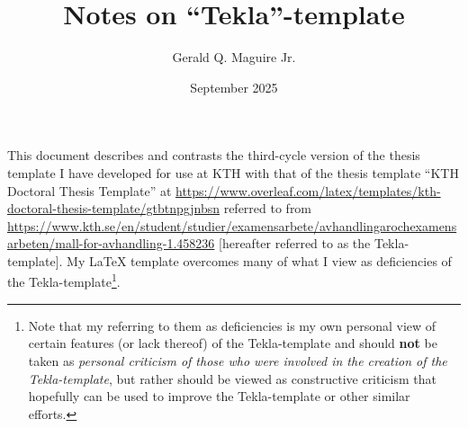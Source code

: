 \documentclass[12pt, twoside]{article}
\title{Notes on ``Tekla''-template}
\author{Gerald Q. Maguire Jr.}
\date{September 2025}
\renewcommand{\sectionmark}[1]{%
\markboth{#1}{}}
\begin{document}
\glsresetall[]
\maketitle
{}

This document describes and contrasts the third-cycle version of the thesis
template I have developed for use at \gls{KTH} with that of the thesis
template ``KTH Doctoral Thesis Template'' at 
\url{https://www.overleaf.com/latex/templates/kth-doctoral-thesis-template/gtbtnpgjnbsn} referred to from \url{https://www.kth.se/en/student/studier/examensarbete/avhandlingarochexamensarbeten/mall-for-avhandling-1.458236}
[hereafter referred to as the Tekla-template].
My \LaTeX{} template overcomes many of what I view as deficiencies of the Tekla-template\footnote{Note that my referring to them as deficiencies is my own personal view of certain features (or lack thereof) of the Tekla-template and should \textbf{not} be taken as \textit{personal criticism of those who were involved in the creation of the Tekla-template}, but rather should be viewed as constructive criticism that hopefully can be used to improve the Tekla-template or other similar efforts.}.
\cleardoublepage
\renewcommand{\sectionmark}[1]{ \markboth{#1}{}}
\tableofcontents
\markboth{\contentsname}{}
\cleardoublepage
\setcounter{page}{1}
\glsresetall
\end{document}
